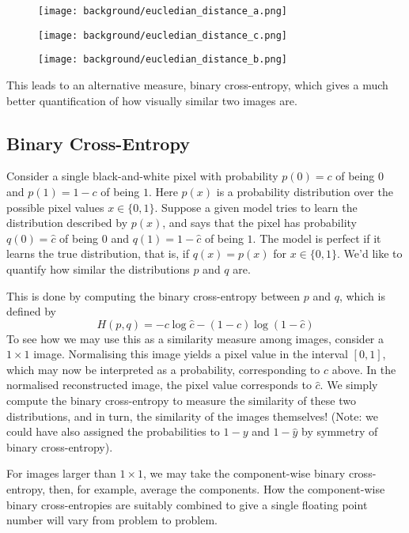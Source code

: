 \begin{figure}[!htb]
\centering
{}
\centering
  \texttt{[image: background/eucledian\_distance\_a.png]}
  \caption{}\label{fig:eucledian_distance_a}
\endminipage\hfill
{}
\centering
  \texttt{[image: background/eucledian\_distance\_c.png]}
  \caption{}\label{fig:eucledian_distance_c}
\endminipage\hfill
{}%
\centering
  \texttt{[image: background/eucledian\_distance\_b.png]}
  \caption{}\label{fig:eucledian_distance_b}
\endminipage
\end{figure}

This leads to an alternative measure, binary cross-entropy, which gives a much better quantification of how visually similar two images are.

\subsection{Binary Cross-Entropy}
Consider a single black-and-white pixel with probability $p(0) = c$ of being $0$ and $p(1) = 1 - c$ of being $1$. Here $p(x)$ is a probability distribution over the possible pixel values $x \in \{0, 1\}$. Suppose a given model tries to learn the distribution described by $p(x)$, and says that the pixel has probability $q(0) = \hat{c}$ of being $0$ and $q(1) = 1 - \hat{c}$ of being $1$. The model is perfect if it learns the true distribution, that is, if $q(x) = p(x)$ for $x\in\{0,1\}$. We'd like to quantify how similar the distributions $p$ and $q$ are.

This is done by computing the binary cross-entropy between $p$ and $q$, which is defined by $$H(p,q) = -c\log\hat{c} - (1-c)\log(1-\hat{c})$$ To see how we may use this as a similarity measure among images, consider a $1\times1$ image. Normalising this image yields a pixel value in the interval $[0, 1]$, which may now be interpreted as a probability, corresponding to $c$ above. In the normalised reconstructed image, the pixel value corresponds to $\hat{c}$. We simply compute the binary cross-entropy to measure the similarity of these two distributions, and in turn, the similarity of the images themselves! (Note: we could have also assigned the probabilities to $1-y$ and $1-\hat{y}$ by symmetry of binary cross-entropy).

For images larger than $1 \times 1$, we may take the component-wise binary cross-entropy, then, for example, average the components. How the component-wise binary cross-entropies are suitably combined to give a single floating point number will vary from problem to problem.



